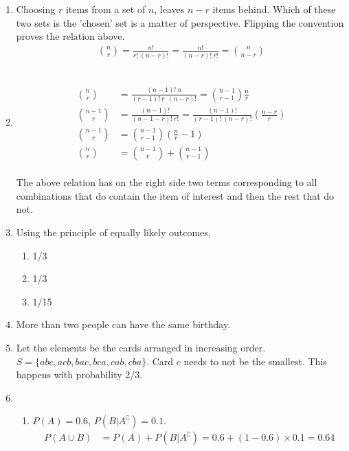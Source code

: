 \begin{enumerate}
	\item Choosing $ r $ items from a set of $ n $, leaves $ n-r $ items behind. Which of these two sets is the 'chosen' set is a matter of perspective. Flipping the convention proves the relation above.
	\begin{align}
		\binom{n}{r} = \frac{n!}{r!\ (n-r)!} = \frac{n!}{(n-r)!\ r!} = \binom{n}{n-r}
	\end{align}\\
	
	\item 	
		\begin{align}
			\binom{n}{r} &= \frac{(n - 1)!\ n}{(r - 1)!\ r\ \ (n-r)!} = \binom{n-1}{r-1} \frac{n}{r} \\
			\binom{n-1}{r} &= \frac{(n-1)!}{(n-1-r)!\ r!} = \frac{(n-1)!}{(r-1)!\ (n-r)!} \left( \frac{n-r}{r} \right) \\
			\binom{n-1}{r} &= \binom{n-1}{r-1} \left( \frac{n}{r} - 1 \right) \\
			\binom{n}{r} &= \binom{n-1}{r} + \binom{n-1}{r-1} 
		\end{align}
	 \\
	
	The above relation has on the right side two terms corresponding to all combinations that do contain the item of interest and then the rest that do not.\\
	
	\item Using the principle of equally likely outcomes, 
	\begin{enumerate}
		\item 1/3 
		\item 1/3 
		\item 1/15
	\end{enumerate}
	
	\item More than two people can have the same birthday.
	
	\item Let the elements be the cards arranged in increasing order. \\
	$ S = \{ abc, acb, bac, bca, cab, cba \} $. Card $ c $ needs to not be the smallest. This happens with probability 2/3.
	
	\item \begin{enumerate}
		\item 	$ P(A) = 0.6 $, $ P(B|A^\complement) = 0.1 $. \\
		\begin{align}
			P(A \cup B) &= P(A) + P(B|A^\complement) = 0.6 + (1 - 0.6) \times 0.1 = 0.64
		\end{align}
		

\end{enumerate}
\end{enumerate}
